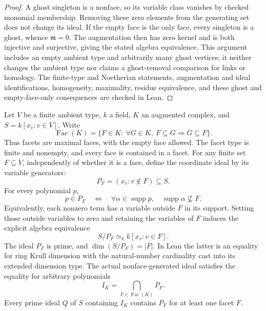 \begin{proof}
A ghost singleton is a nonface, so its variable class vanishes by checked
monomial membership. Removing these zero elements from the generating set
does not change its ideal. If the empty face is the only face, every
singleton is a ghost, whence $\mathfrak m=0$. The augmentation then has
zero kernel and is both injective and surjective, giving the stated algebra
equivalence. This argument includes an empty ambient type and arbitrarily
many ghost vertices; it neither changes the ambient type nor claims a
ghost-removal comparison for links or homology. The finite-type and
Noetherian statements, augmentation and ideal identifications, homogeneity,
maximality, residue equivalence, and these ghost and empty-face-only
consequences are checked in Lean.
\end{proof}

\begin{proposition}\label{prop:facet-primes}
\leanok
Let $V$ be a finite ambient type, $k$ a field, $K$ an augmented complex,
and $S=k[x_v:v\in V]$. Write
\[
 \operatorname{Fac}(K)=
 \{F\in K:\ \forall G\in K,\ F\subseteq G\Longrightarrow G\subseteq F\}.
\]
Thus facets are maximal faces, with the empty face allowed. The facet
type is finite and nonempty, and every face is contained in a facet.
For any finite set $F\subseteq V$, independently of whether it is a face,
define the coordinate ideal by its variable generators:
\[
 P_F=(x_v:v\notin F)\subseteq S.
\]
For every polynomial $p$,
\[
 p\in P_F\quad\Longleftrightarrow\quad
 \forall\alpha\in\operatorname{supp}p,\quad
       \operatorname{supp}\alpha\not\subseteq F.
\]
Equivalently, each nonzero term has a variable outside $F$ in its support.
Setting those outside variables to zero and retaining the variables of $F$
induces the explicit algebra equivalence
\[
 S/P_F\simeq_k k[x_v:v\in F].
\]
The ideal $P_F$ is prime, and $\dim(S/P_F)=|F|$. In Lean the latter is
an equality for ring Krull dimension with the natural-number cardinality
cast into its extended dimension type. The actual nonface-generated ideal
satisfies the equality for arbitrary polynomials
\[
 I_K=\bigcap_{F\in\operatorname{Fac}(K)}P_F.
\]
Every prime ideal $Q$ of $S$ containing $I_K$ contains $P_F$ for at least
one facet $F$.


\end{proposition}
